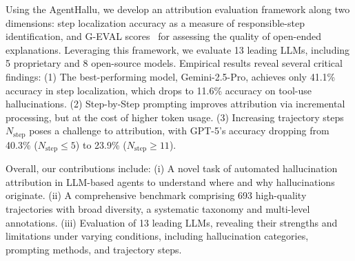Using the AgentHallu, we develop an attribution evaluation framework along two dimensions: step localization accuracy as a measure of responsible-step identification, and G-EVAL scores~\cite{liu2023g} for assessing the quality of open-ended explanations. Leveraging this framework, we evaluate 13 leading LLMs, including 5 proprietary and 8 open-source models. Empirical results reveal several critical findings: (1) The best-performing model, Gemini-2.5-Pro, achieves only 41.1\% accuracy in step localization, which drops to 11.6\% accuracy on tool-use hallucinations. (2) Step-by-Step prompting improves attribution via incremental processing, but at the cost of higher token usage. (3) Increasing trajectory steps $N_{\text{step}}$ poses a challenge to attribution, with GPT-5's accuracy dropping from 40.3\% ($N_{\text{step}} \le 5$) to 23.9\% ($N_{\text{step}} \ge 11$).





Overall, our contributions include: (i) A novel task of automated hallucination attribution in LLM-based agents to understand where and why hallucinations originate. (ii) A comprehensive benchmark comprising 693 high-quality trajectories with broad diversity, a systematic taxonomy and multi-level annotations. (iii) Evaluation of 13 leading LLMs, revealing their strengths and limitations under varying conditions, including hallucination categories, prompting methods, and trajectory steps.



